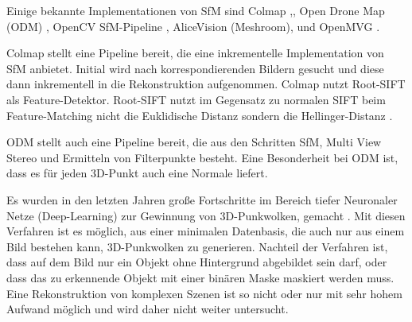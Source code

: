 \documentclass[12pt,titlepage, twoside]{article}
\begin{document}


Einige bekannte Implementationen von SfM sind Colmap \cite{schoenberger2016sfm},\cite{schoenberger2016mvs}, Open Drone Map (ODM) \cite{ODM}, OpenCV SfM-Pipeline \cite{opencv}, AliceVision (Meshroom)\cite{Moulon2012},\cite{Jancosek2011} und OpenMVG \cite{moulon2016openmvg}.

Colmap stellt eine Pipeline bereit, die eine inkrementelle Implementation von SfM anbietet. Initial wird nach korrespondierenden Bildern gesucht und diese dann inkrementell in die Rekonstruktion aufgenommen.
Colmap nutzt Root-SIFT als Feature-Detektor. Root-SIFT nutzt im Gegensatz zu normalen SIFT beim Feature-Matching nicht die Euklidische Distanz sondern die Hellinger-Distanz \cite{arandjelovic2012three}.

ODM stellt auch eine Pipeline bereit, die aus den Schritten SfM, Multi View Stereo und Ermitteln von Filterpunkte besteht. Eine Besonderheit bei ODM ist, dass es für jeden 3D-Punkt auch eine Normale liefert.

Es wurden in den letzten Jahren große Fortschritte im Bereich tiefer Neuronaler Netze (Deep-Learning) \cite{lecun2015deep} zur Gewinnung von 3D-Punkwolken, gemacht \cite{fan2016point} \cite{tatarchenko2017octree} \cite{wang2018pixel2mesh}. 
Mit diesen Verfahren ist es möglich, aus einer minimalen Datenbasis, die auch nur aus einem Bild bestehen kann, 3D-Punkwolken zu generieren.
Nachteil der Verfahren ist, dass auf dem Bild nur ein Objekt ohne Hintergrund abgebildet sein darf, oder dass das zu erkennende Objekt mit einer binären Maske maskiert werden muss.
Eine Rekonstruktion von komplexen Szenen ist so nicht oder nur mit sehr hohem Aufwand möglich \cite{rs11222644} und wird daher nicht weiter untersucht. 
\end{document}
